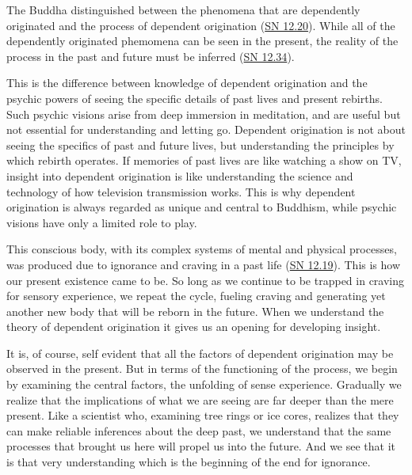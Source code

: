 \documentclass[12pt,openany]{book}%
\begin{document}
The Buddha distinguished between the phenomena that are dependently originated and the process of dependent origination (\href{https://suttacentral.net/sn12.20}{SN 12.20}). While all of the dependently originated phemomena can be seen in the present, the reality of the process in the past and future must be inferred (\href{https://suttacentral.net/sn12.34}{SN 12.34}).

This is the difference between knowledge of dependent origination and the psychic powers of seeing the specific details of past lives and present rebirths. Such psychic visions arise from deep immersion in meditation, and are useful but not essential for understanding and letting go. Dependent origination is not about seeing the specifics of past and future lives, but understanding the principles by which rebirth operates. If memories of past lives are like watching a show on TV, insight into dependent origination is like understanding the science and technology of how television transmission works. This is why dependent origination is always regarded as unique and central to Buddhism, while psychic visions have only a limited role to play.

This conscious body, with its complex systems of mental and physical processes, was produced due to ignorance and craving in a past life (\href{https://suttacentral.net/sn12.19}{SN 12.19}). This is how our present existence came to be. So long as we continue to be trapped in craving for sensory experience, we repeat the cycle, fueling craving and generating yet another new body that will be reborn in the future. When we understand the theory of dependent origination it gives us an opening for developing insight.

It is, of course, self evident that all the factors of dependent origination may be observed in the present. But in terms of the functioning of the process, we begin by examining the central factors, the unfolding of sense experience. Gradually we realize that the implications of what we are seeing are far deeper than the mere present. Like a scientist who, examining tree rings or ice cores, realizes that they can make reliable inferences about the deep past, we understand that the same processes that brought us here will propel us into the future. And we see that it is that very understanding which is the beginning of the end for ignorance.
\end{document}
